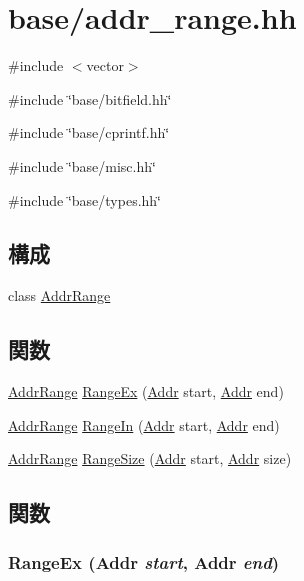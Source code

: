 \hypertarget{addr__range_8hh}{
\section{base/addr\_\-range.hh}
\label{addr__range_8hh}
}
{\ttfamily \#include $<$vector$>$}\par
{\ttfamily \#include \char`\"{}base/bitfield.hh\char`\"{}}\par
{\ttfamily \#include \char`\"{}base/cprintf.hh\char`\"{}}\par
{\ttfamily \#include \char`\"{}base/misc.hh\char`\"{}}\par
{\ttfamily \#include \char`\"{}base/types.hh\char`\"{}}\par
\subsection*{構成}
\begin{DoxyCompactItemize}
\item 
class \hyperlink{classAddrRange}{AddrRange}
\end{DoxyCompactItemize}
\subsection*{関数}
\begin{DoxyCompactItemize}
\item 
\hyperlink{classAddrRange}{AddrRange} \hyperlink{addr__range_8hh_a466b153d63d6154a31922900afd6745b}{RangeEx} (\hyperlink{base_2types_8hh_af1bb03d6a4ee096394a6749f0a169232}{Addr} start, \hyperlink{base_2types_8hh_af1bb03d6a4ee096394a6749f0a169232}{Addr} end)
\item 
\hyperlink{classAddrRange}{AddrRange} \hyperlink{addr__range_8hh_a5c98bada80d8aa7845117af0eba98dc5}{RangeIn} (\hyperlink{base_2types_8hh_af1bb03d6a4ee096394a6749f0a169232}{Addr} start, \hyperlink{base_2types_8hh_af1bb03d6a4ee096394a6749f0a169232}{Addr} end)
\item 
\hyperlink{classAddrRange}{AddrRange} \hyperlink{addr__range_8hh_a59cd089c5b2fbc6eecd8507757432740}{RangeSize} (\hyperlink{base_2types_8hh_af1bb03d6a4ee096394a6749f0a169232}{Addr} start, \hyperlink{base_2types_8hh_af1bb03d6a4ee096394a6749f0a169232}{Addr} size)
\end{DoxyCompactItemize}


\subsection{関数}
\hypertarget{addr__range_8hh_a466b153d63d6154a31922900afd6745b}{
\subsubsection[{RangeEx}]{ RangeEx ({\bf Addr} {\em start}, \/  {\bf Addr} {\em end})}}
\label{addr__range_8hh_a466b153d63d6154a31922900afd6745b}



